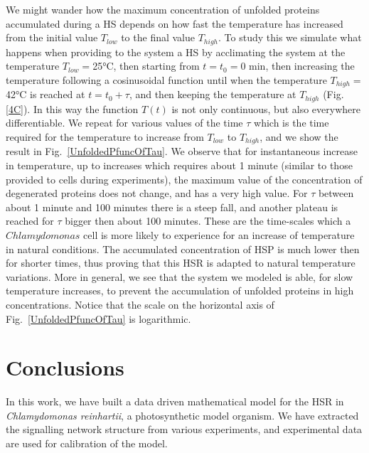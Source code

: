 \documentclass[oneside, 10pt, a4paper, twocolumn]{article}
\begin{document}
We might wander how the maximum concentration of unfolded proteins accumulated during a HS depends on how fast the temperature has increased from the initial value $T_{low}$ to the final value $T_{high}$. To study this we simulate what happens when providing to the system a HS by acclimating the system at the temperature $T_{low}=$25°C, then starting from $t=t_0=0$ min, then increasing the temperature following a cosinusoidal function until when the temperature $T_{high}=$42°C is reached at $t=t_0+\tau$, and then keeping the temperature at $T_{high}$ (Fig. \ref{4C}). In this way the function $T\left(t\right)$ is not only continuous, but also everywhere differentiable. We repeat for various values of the time $\tau$ which is the time required for the temperature to increase from $T_{low}$ to $T_{high}$, and we show the result in Fig.~\ref{UnfoldedPfuncOfTau}. We observe that for instantaneous increase in temperature, up to increases which requires about 1 minute (similar to those provided to cells during experiments), the maximum value of the concentration of degenerated proteins does not change, and has a very high value. For $\tau$ between about 1 minute and 100 minutes there is a steep fall, and another plateau is reached for $\tau$ bigger then about 100 minutes. These are the time-scales which a $Chlamydomonas$ cell is more likely to experience for an increase of temperature in natural conditions. The accumulated concentration of HSP is much lower then for shorter times, thus proving that this HSR is adapted to natural temperature variations. More in general, we see that the system we modeled is able, for slow temperature increases, to prevent the accumulation of unfolded proteins in high concentrations. Notice that the scale on the horizontal axis of Fig.~\ref{UnfoldedPfuncOfTau} is logarithmic.




\section{Conclusions}
\label{SectionConclusions}

In this work, we have built a data driven mathematical model for the HSR in \emph{Chlamydomonas reinhartii}, a photosynthetic model organism. We have extracted the signalling network structure from various experiments, and experimental data are used for calibration of the model. 
\end{document}
